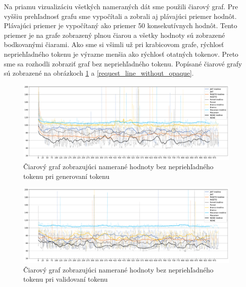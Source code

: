Na priamu vizualizáciu všetkých nameraných dát sme použili čiarový graf. Pre vyššiu prehľadnosť grafu sme vypočítali a zobrali aj plávajúci priemer hodnôt. Plávajúci priemer je vypočítaný ako priemer 50 konsekutívnych hodnôt. Tento priemer je na grafe zobrazený plnou čiarou a všetky hodnoty sú zobrazené bodkovanými čiarami. Ako sme si všimli už pri krabicovom grafe, rýchlosť nepriehľadného tokenu je výrazne menšia ako rýchlosť otatných tokenov. Preto sme sa rozhodli zobraziť graf bez nepriehľadného tokenu. Popísané čiarové grafy sú zobrazené na obrázkoch \ref{fig:signin_line_without_opaque} a \ref{request_line_without_opaque}.

\begin{figure}
  \centerline{\includegraphics[width=1\textwidth]{images/signin_line_without_opaque}}
  \caption[Čiarový graf -- generovanie, hodnoty bez nepriehľadného tokenu]{Čiarový graf zobrazujúci namerané hodnoty bez nepriehľadného tokenu pri generovaní tokenu}
  \label{fig:signin_line_without_opaque}
\end{figure}

\begin{figure}
  \centerline{\includegraphics[width=1\textwidth]{images/request_line_without_opaque}}
  \caption[Čiarový graf -- validácia, hodnoty bez nepriehľadného tokenu]{Čiarový graf zobrazujúci namerané hodnoty bez nepriehľadného tokenu pri validovaní tokenu}
  \label{fig:request_line_without_opaque}
\end{figure}

